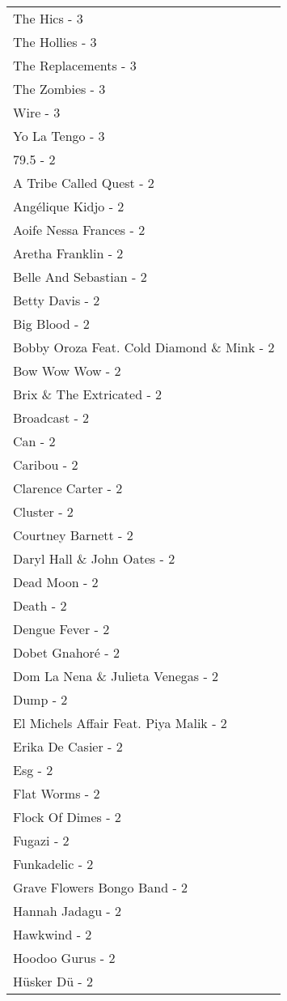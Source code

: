 \documentclass[
]{article}
\begin{document}
\begin{longtable}{l}
The Hics - 3 \\ 
The Hollies - 3 \\ 
The Replacements - 3 \\ 
The Zombies - 3 \\ 
Wire - 3 \\ 
Yo La Tengo - 3 \\ 
79.5 - 2 \\ 
A Tribe Called Quest - 2 \\ 
Angélique Kidjo - 2 \\ 
Aoife Nessa Frances - 2 \\ 
Aretha Franklin - 2 \\ 
Belle And Sebastian - 2 \\ 
Betty Davis - 2 \\ 
Big Blood - 2 \\ 
Bobby Oroza Feat. Cold Diamond \& Mink - 2 \\ 
Bow Wow Wow - 2 \\ 
Brix \& The Extricated - 2 \\ 
Broadcast - 2 \\ 
Can - 2 \\ 
Caribou - 2 \\ 
Clarence Carter - 2 \\ 
Cluster - 2 \\ 
Courtney Barnett - 2 \\ 
Daryl Hall \& John Oates - 2 \\ 
Dead Moon - 2 \\ 
Death - 2 \\ 
Dengue Fever - 2 \\ 
Dobet Gnahoré - 2 \\ 
Dom La Nena \& Julieta Venegas - 2 \\ 
Dump - 2 \\ 
El Michels Affair Feat. Piya Malik - 2 \\ 
Erika De Casier - 2 \\ 
Esg - 2 \\ 
Flat Worms - 2 \\ 
Flock Of Dimes - 2 \\ 
Fugazi - 2 \\ 
Funkadelic - 2 \\ 
Grave Flowers Bongo Band - 2 \\ 
Hannah Jadagu - 2 \\ 
Hawkwind - 2 \\ 
Hoodoo Gurus - 2 \\ 
Hüsker Dü - 2 \\ 

\end{longtable}
\end{document}
